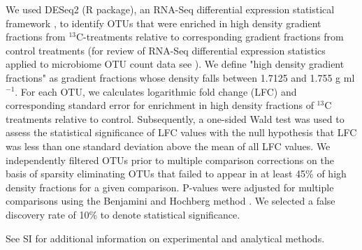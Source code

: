 We used DESeq2 (R package), an RNA-Seq differential expression statistical
framework \citep{love2014}, to identify OTUs that were enriched in high density
gradient fractions from $^{13}$C-treatments relative to corresponding gradient
fractions from control treatments (for review of RNA-Seq differential
expression statistics applied to microbiome OTU count data see
\citep{McMurdie2014}). We define "high density gradient fractions" as gradient
fractions whose density falls between 1.7125 and 1.755 g ml$^{-1}$. For each OTU,
we calculates logarithmic fold change (LFC) and corresponding standard error for
enrichment in high density fractions of $^{13}$C treatments relative to control.
Subsequently, a one-sided Wald test was used to assess the statistical significance
of LFC values with the null hypothesis that LFC was less than one standard deviation
above the mean of all LFC values. We independently filtered OTUs prior to multiple
comparison corrections on the basis of sparsity eliminating OTUs that failed to 
appear in at least 45\% of high density fractions for a given comparison. P-values
were adjusted for multiple comparisons using the Benjamini and Hochberg method
\citep{benjamini1995}. We selected a false discovery rate of 10\% to denote
statistical significance.

See SI for additional information on experimental and analytical methods.
